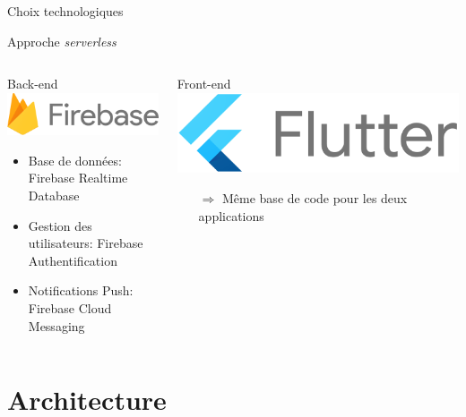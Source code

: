 \documentclass{beamer}
\begin{document}
\begin{frame}{Choix technologiques}

Approche \emph{serverless}

\begin{columns}

    \begin{column}[T]{.45\textwidth}

        Back-end\\
        \includegraphics[height=.5cm]{firebase.png}

        \begin{itemize}
            \item Base de données: Firebase Realtime Database
            \item Gestion des utilisateurs: Firebase Authentification
            \item Notifications Push: Firebase Cloud Messaging
        \end{itemize}

    \end{column}

    \begin{column}[T]{.45\textwidth}

        Front-end\\
        \includegraphics[height=.5cm]{flutter.png}

        \begin{itemize}
            \item[$\Rightarrow$] Même base de code pour les deux applications
        \end{itemize}

    \end{column}

\end{columns}

\end{frame}

\section{Architecture}
\end{document}
